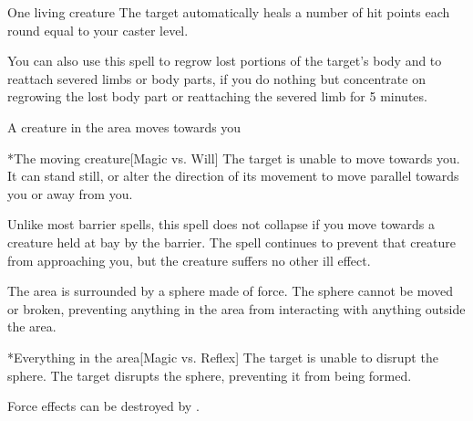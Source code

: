 \spelldur{\durshort}
\begin{spelltarget}{One living creature}
    \spelleffect The target automatically heals a number of hit points each round equal to your caster level.
    \par You can also use this spell to regrow lost portions of the target's body and to reattach severed limbs or body parts, if you do nothing but concentrate on regrowing the lost body part or reattaching the severed limb for 5 minutes.
\end{spelltarget}

\spelldur{\durshort \dismissable}
\begin{spelltrigger}{A creature in the area moves towards you}
    \begin{spelltarget}*{The moving creature}[Magic vs. Will]
        \spellsuccess The target is unable to move towards you. It can stand still, or alter the direction of its movement to move parallel towards you or away from you.
    \end{spelltarget}
\end{spelltrigger}
\spellnotes Unlike most barrier spells, this spell does not collapse if you move towards a creature held at bay by the barrier. The spell continues to prevent that creature from approaching you, but the creature suffers no other ill effect.

\spellrng{\rngmed}
\spelldur{\durshort \dismissable}
\spellline
\spelleffect The area is surrounded by a sphere made of force. The sphere cannot be moved or broken, preventing anything in the area from interacting with anything outside the area.
\begin{spelltarget}*{Everything in the area}[Magic vs. Reflex]
    \spellsuccess The target is unable to disrupt the sphere.
    \spellfailure The target disrupts the sphere, preventing it from being formed.
\end{spelltarget}
\spellnotes Force effects can be destroyed by .

